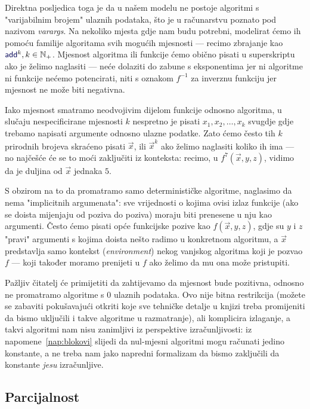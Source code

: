 Direktna posljedica toga je da u našem modelu ne postoje algoritmi s "varijabilnim brojem" ulaznih podataka, što je u računarstvu poznato pod nazivom \emph{varargs}. Na nekoliko mjesta gdje nam budu potrebni, modelirat ćemo ih pomoću familije algoritama svih mogućih mjesnosti --- recimo zbrajanje kao $\f{add}^k,k\in\N_+$. Mjesnost algoritma ili funkcije ćemo obično pisati u superskriptu ako je želimo naglasiti --- neće dolaziti do zabune s eksponentima jer ni algoritme ni funkcije nećemo potencirati, niti s oznakom $f^{-1}$ za inverznu funkciju jer mjesnost ne može biti negativna.

Iako mjesnost smatramo neodvojivim dijelom funkcije odnosno algoritma, u slučaju nespecificirane mjesnosti $k$ nespretno je pisati $x_1,x_2,\dotsc,x_k$ svugdje gdje trebamo napisati argumente odnosno ulazne podatke. Zato ćemo često tih $k$ prirodnih brojeva skraćeno pisati $\vec x$, ili $\vec x^k$ ako želimo naglasiti koliko ih ima --- no najčešće će se to moći zaključiti iz konteksta: recimo, u $f^7(\vec x,y,z)$, vidimo da je duljina od $\vec x$ jednaka $5$.

\begin{napomena}[{name=[svi argumenti moraju biti eksplicitno navedeni]}]\label{nap:blokovi}
S obzirom na to da promatramo samo determinističke algoritme, naglasimo da nema "implicitnih argumenata": sve vrijednosti o kojima ovisi izlaz funkcije (ako se doista mijenjaju od poziva do poziva) moraju biti prenesene u nju kao argumenti. Često ćemo pisati opće funkcijske pozive kao $f(\vec x,y,z)$, gdje su $y$ i $z$ "pravi" argumenti s kojima doista nešto radimo u konkretnom algoritmu, a $\vec x$ predstavlja samo kontekst (\emph{environment}) nekog vanjskog algoritma koji je pozvao $f$ --- koji također moramo prenijeti u $f$ ako želimo da mu ona može pristupiti.
\end{napomena}

Pažljiv čitatelj će primijetiti da zahtijevamo da mjesnost bude pozitivna, odnosno ne promatramo algoritme s $0$ ulaznih podataka. Ovo nije bitna restrikcija (možete se zabaviti pokušavajući otkriti koje sve tehničke detalje u knjizi treba promijeniti da bismo uključili i takve algoritme u razmatranje), ali komplicira izlaganje, a takvi algoritmi nam nisu zanimljivi iz perspektive izračunljivosti: iz napomene~\ref{nap:blokovi} slijedi da nul-mjesni algoritmi mogu računati jedino konstante, a ne treba nam jako napredni formalizam da bismo zaključili da konstante \emph{jesu} izračunljive.

\subsection{Parcijalnost}

